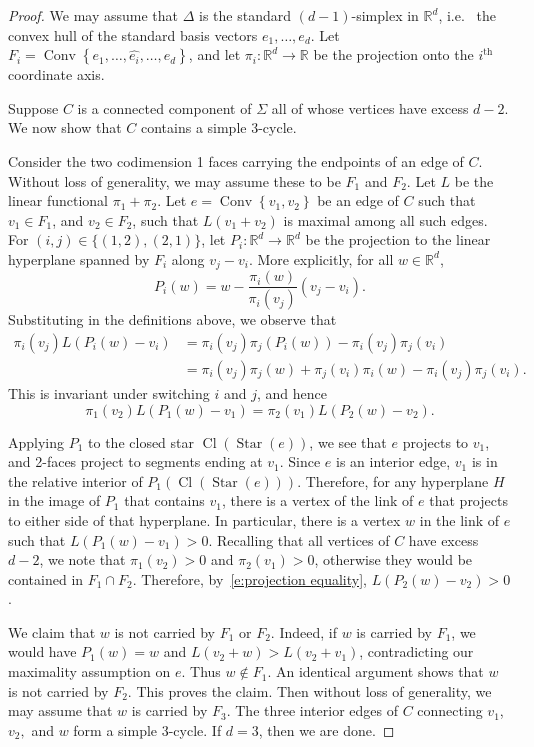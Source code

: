 \documentclass[10pt]{amsart}
\newcommand\R{\mathbb{R}}
\DeclareMathOperator{\Cl}{Cl}
\DeclareMathOperator{\Convop}{Conv}
\newcommand{\Conv}[1]{\Convop\left\{{#1}\right\}}
\DeclareMathOperator{\Star}{Star}
\newcommand{\ie}{i.e.\ }
\begin{document}
\begin{proof}
We may assume that $\Delta$ is the standard $(d-1)$-simplex in $\R^{d}$, \ie 
the convex hull of the standard basis vectors $e_1,\ldots,e_{d}$. Let
$F_i = \Conv{e_1,\ldots,\widehat{e_i},\ldots,e_{d}}$, and let 
$\pi_i : \R^d \to \R$ be the projection onto the $i^{\mathrm{th}}$ coordinate axis.

Suppose $C$ is a connected component of $\Sigma$ all of whose vertices have excess $d-2$. 
We now show that $C$ contains a simple 3-cycle. 

Consider the two codimension 1 faces carrying the endpoints of an edge of $C$. Without 
loss of generality, we may assume these to be $F_1$ and $F_2$. Let $L$ be the linear 
functional $ \pi_1 + \pi_2$. Let $e= \Conv{v_1, v_2}$ be an edge of $C$ such that 
$v_1 \in F_1$, and $v_2 \in F_2$, such that $L(v_1 + v_2)$ is maximal among all such 
edges. 
For $(i,j) \in \{(1,2),(2,1)\}$, let $P_i : \R^{d}\to\R^d$ be the projection to the 
linear hyperplane spanned by $F_i$ along $v_j-v_i$. 
More explicitly, for all $w \in \R^{d}$,
\[
P_i(w) = w - \frac{\pi_i(w)}{\pi_i(v_j)}(v_j - v_i).
\]
Substituting in the definitions above, we observe that 
\begin{align*}
\pi_i(v_j)L(P_i(w) - v_i) & = \pi_i(v_j)\pi_j(P_i(w)) - \pi_i(v_j)\pi_j(v_i) \\
& = \pi_i(v_j)\pi_j(w) + \pi_j(v_i)\pi_i(w) - \pi_i(v_j) \pi_j(v_i).
\end{align*}
This is invariant under switching $i$ and $j$, and hence
\begin{equation}\label{e:projection equality}
\pi_1(v_2)L(P_1(w) - v_1) = \pi_2(v_1)L(P_2(w) - v_2).
\end{equation}

Applying $P_1$ to the closed star $\Cl(\Star(e))$, we see that $e$ projects to $v_1$, and 
2-faces project to segments ending at $v_1$. Since $e$ is an interior edge, $v_1$ is in 
the relative interior of $P_1(\Cl(\Star(e)))$. Therefore, 
for any hyperplane $H$ in the image of $P_1$ that contains $v_1$, there is a vertex of 
the link of $e$ that projects to either side of that hyperplane. In particular,
there is a vertex $w$ in the link of $e$ such that $L(P_1(w) - v_1) > 0$. 
Recalling that all vertices of $C$ have excess $d-2$, we note that 
$\pi_1(v_2)>0$ and $\pi_2(v_1)>0$, otherwise they would be contained in 
$F_1\cap F_2$.
Therefore, by~\eqref{e:projection equality}, $L(P_2(w) - v_2) > 0$. 

We claim that $w$ is not carried by $F_1$ or $F_2$. 
Indeed, if $w$ is carried by $F_1$, we would have $P_1(w) = w$ and 
$L(v_2 + w) > L(v_2 + v_1)$, contradicting our maximality assumption on $e$. Thus 
$w \notin F_1$. An identical argument shows that $w$ is not carried by $F_2$. This proves 
the claim. Then without loss of generality, we may assume that $w$ is carried by $F_3$. 
The three interior edges of $C$ connecting $v_1$, $v_2,$ and $w$ form a simple 3-cycle. 
If $d = 3$, then we are done.


\end{proof}
\end{document}
